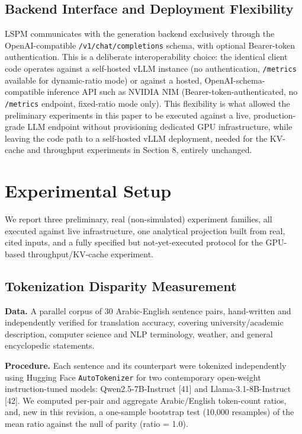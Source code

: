 \documentclass[pdflatex,sn-basic,Numbered]{sn-jnl}
\begin{document}
\subsection{Backend Interface and Deployment Flexibility}
LSPM communicates with the generation backend exclusively through the OpenAI-compatible \texttt{/v1/chat/completions} schema, with optional Bearer-token authentication. This is a deliberate interoperability choice: the identical client code operates against a self-hosted vLLM instance (no authentication, \texttt{/metrics} available for dynamic-ratio mode) or against a hosted, OpenAI-schema-compatible inference API such as NVIDIA NIM (Bearer-token-authenticated, no \texttt{/metrics} endpoint, fixed-ratio mode only). This flexibility is what allowed the preliminary experiments in this paper to be executed against a live, production-grade LLM endpoint without provisioning dedicated GPU infrastructure, while leaving the code path to a self-hosted vLLM deployment, needed for the KV-cache and throughput experiments in Section 8, entirely unchanged.

\section{Experimental Setup}
We report three preliminary, real (non-simulated) experiment families, all executed against live infrastructure, one analytical projection built from real, cited inputs, and a fully specified but not-yet-executed protocol for the GPU-based throughput/KV-cache experiment.

\subsection{Tokenization Disparity Measurement}
\textbf{Data.} A parallel corpus of 30 Arabic-English sentence pairs, hand-written and independently verified for translation accuracy, covering university/academic description, computer science and NLP terminology, weather, and general encyclopedic statements.

\textbf{Procedure.} Each sentence and its counterpart were tokenized independently using Hugging Face \texttt{AutoTokenizer} for two contemporary open-weight instruction-tuned models: Qwen2.5-7B-Instruct [41] and Llama-3.1-8B-Instruct [42]. We computed per-pair and aggregate Arabic/English token-count ratios, and, new in this revision, a one-sample bootstrap test (10,000 resamples) of the mean ratio against the null of parity (ratio = 1.0).
\end{document}
